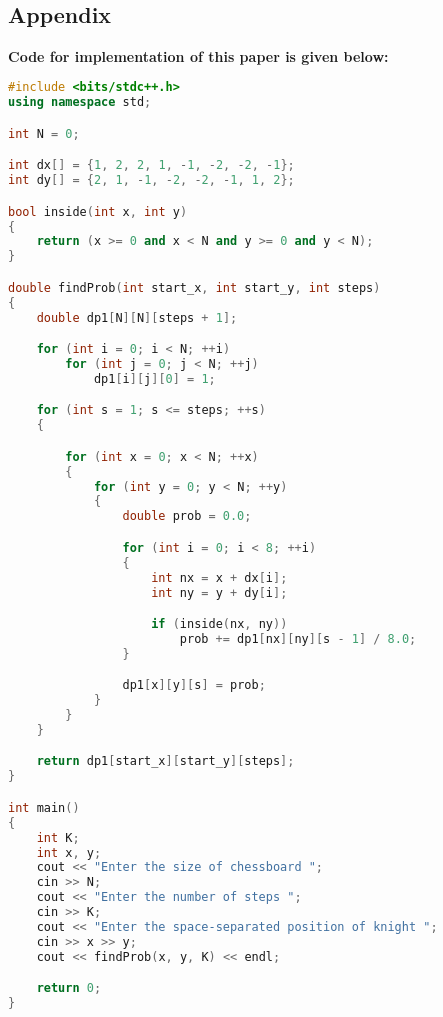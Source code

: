 \documentclass[conference]{IEEEtran}
\begin{document}
\color{black}
\
\begin{titlepage}
    \begin{center}
        \Huge
        \section*{Appendix}
        \end{center}
         \textbf{Code for implementation of this paper is given below:}
\begin{lstlisting}[language=C++,caption=Code for this paper]
#include <bits/stdc++.h>
using namespace std;

int N = 0;

int dx[] = {1, 2, 2, 1, -1, -2, -2, -1};
int dy[] = {2, 1, -1, -2, -2, -1, 1, 2};

bool inside(int x, int y)
{
    return (x >= 0 and x < N and y >= 0 and y < N);
}

double findProb(int start_x, int start_y, int steps)
{
    double dp1[N][N][steps + 1];

    for (int i = 0; i < N; ++i)
        for (int j = 0; j < N; ++j)
            dp1[i][j][0] = 1;

    for (int s = 1; s <= steps; ++s)
    {

        for (int x = 0; x < N; ++x)
        {
            for (int y = 0; y < N; ++y)
            {
                double prob = 0.0;

                for (int i = 0; i < 8; ++i)
                {
                    int nx = x + dx[i];
                    int ny = y + dy[i];

                    if (inside(nx, ny))
                        prob += dp1[nx][ny][s - 1] / 8.0;
                }

                dp1[x][y][s] = prob;
            }
        }
    }

    return dp1[start_x][start_y][steps];
}

int main()
{
    int K;
    int x, y;
    cout << "Enter the size of chessboard ";
    cin >> N;
    cout << "Enter the number of steps ";
    cin >> K;
    cout << "Enter the space-separated position of knight ";
    cin >> x >> y;
    cout << findProb(x, y, K) << endl;

    return 0;
}
    
   
\end{lstlisting}
\end{titlepage}
\end{document}
